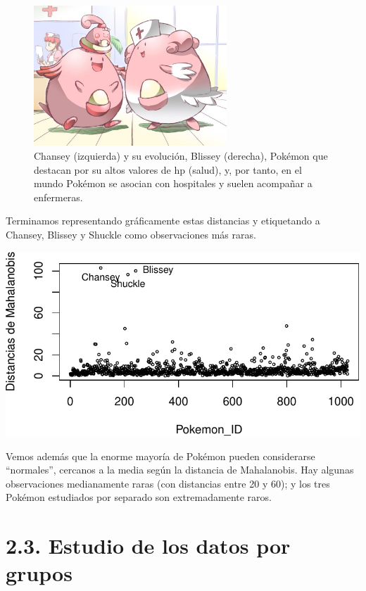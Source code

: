 \documentclass[
  11.8pt,
]{extreport}
\begin{document}
\begin{figure}[H]

{\centering \includegraphics[width=2.85417in,height=\textheight]{trabajo_images/chansey_blissey.jpg}

}

\caption{Chansey (izquierda) y su evolución, Blissey (derecha), Pokémon
que destacan por su altos valores de hp (salud), y, por tanto, en el
mundo Pokémon se asocian con hospitales y suelen acompañar a
enfermeras.}

\end{figure}%

Terminamos representando gráficamente estas distancias y etiquetando a
Chansey, Blissey y Shuckle como observaciones más raras.

\begin{center}
\includegraphics{trabajo_files/figure-pdf/unnamed-chunk-15-1.pdf}
\end{center}

Vemos además que la enorme mayoría de Pokémon pueden considerarse
``normales'', cercanos a la media según la distancia de Mahalanobis. Hay
algunas observaciones medianamente raras (con distancias entre 20 y 60);
y los tres Pokémon estudiados por separado son extremadamente raros.

\section{2.3. Estudio de los datos por
grupos}\label{estudio-de-los-datos-por-grupos}
\end{document}
